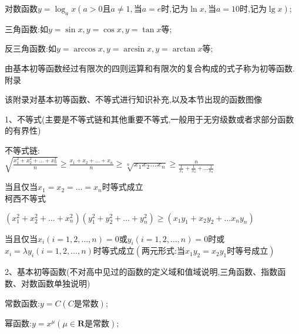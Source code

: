 \documentclass[UTF8]{ctexart}
\begin{document}
对数函数$y=\log _{a}x(a>0\text{且}a\neq 1,\text{当}a=e\text{时,记为}\ln x,\text{当}a=10\text{时,记为}\lg x)$;

三角函数:如$y=\sin x,y=\cos x,y=\tan x$等;

反三角函数:如$y=\arccos x,y=\arcsin x,y=\arctan x$等;

由基本初等函数经过有限次的四则运算和有限次的复合构成的式子称为初等函数.\\

{\heiti 附录}

该附录对基本初等函数、不等式进行知识补充,以及本节出现的函数图像

1、不等式(主要是不等式链和其他重要不等式,一般用于无穷级数或者求部分函数的有界性)

不等式链:\\

$\displaystyle  \sqrt{\frac{x_{1}^{2}+x_{2}^{2}+\ldots +x_{n}^{2}}{n}}\geqslant  \frac{x_{1}+x_{2}+\ldots +x_{n}}{n}\geqslant \sqrt[n]{x_{1}x_{2}\ldots x_{n} } \geqslant \frac{n}{\frac{1}{x_{1}}+\frac{1}{x_{2}}+\ldots \frac{1}{x_{n}}} $

当且仅当$x_{1}=x_{2}=\ldots =x_{n}$时等式成立\\

柯西不等式

$\displaystyle (x_{1}^{2}+x_{2}^{2}+\ldots +x_{n}^{2})(y_{1}^{2}+y_{2}^{2}+\ldots +y_{n}^{2})\geqslant (x_{1}y_{1}+x_{2}y_{2}+\ldots x_{n}y_{n})$

当且仅当$x_{i}(i=1,2,\ldots ,n)=0$或$y_{i}(i=1,2,\ldots ,n)=0$时或$x_{i}=\lambda y_{i}(i=1,2,\ldots ,n)$时等式成立$(\text{两元形式:当}x_{1}y_{2}=x_{2}y_{1}\text{时等号成立})$

2、基本初等函数(不对高中见过的函数的定义域和值域说明,三角函数、指数函数、对数函数单独说明)

常数函数:$y=C(C\text{是常数})$;

幂函数:$y=x^{\mu }(\mu \in \mathbf{R} \text{是常数})$;
\end{document}
